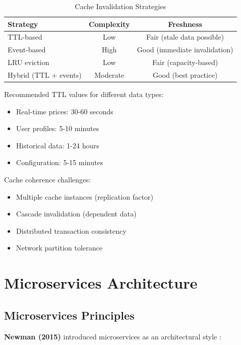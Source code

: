\documentclass[conference]{IEEEtran}
\begin{document}
\begin{table}[h]
\centering
\caption{Cache Invalidation Strategies}
\begin{tabular}{|l|c|c|}
\hline
\textbf{Strategy} & \textbf{Complexity} & \textbf{Freshness} \\
\hline
TTL-based & Low & Fair (stale data possible) \\
Event-based & High & Good (immediate invalidation) \\
LRU eviction & Low & Fair (capacity-based) \\
Hybrid (TTL + events) & Moderate & Good (best practice) \\
\hline
\end{tabular}
\end{table}

Recommended TTL values for different data types:
\begin{itemize}
    \item Real-time prices: 30-60 seconds
    \item User profiles: 5-10 minutes
    \item Historical data: 1-24 hours
    \item Configuration: 5-15 minutes
\end{itemize}

Cache coherence challenges:
\begin{itemize}
    \item Multiple cache instances (replication factor)
    \item Cascade invalidation (dependent data)
    \item Distributed transaction consistency
    \item Network partition tolerance
\end{itemize}

\section{Microservices Architecture}

\subsection{Microservices Principles}

\textbf{Newman (2015)} introduced microservices as an architectural style \cite{newman2015building}:
\end{document}

